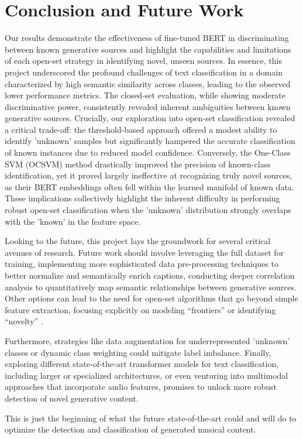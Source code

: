 \documentclass[conference]{IEEEtran}  %
\begin{document}
\section{Conclusion and Future Work}

Our results demonstrate the effectiveness of fine-tuned BERT in discriminating between known generative sources and highlight the capabilities and limitations of each open-set strategy in identifying novel, unseen sources. In essence, this project underscored the profound challenges of text classification in a domain characterized by high semantic similarity across classes, leading to the observed lower performance metrics. The closed-set evaluation, while showing moderate discriminative power, consistently revealed inherent ambiguities between known generative sources. Crucially, our exploration into open-set classification revealed a critical trade-off: the threshold-based approach offered a modest ability to identify 'unknown' samples but significantly hampered the accurate classification of known instances due to reduced model confidence. Conversely, the One-Class SVM (OCSVM) method drastically improved the precision of known-class identification, yet it proved largely ineffective at recognizing truly novel sources, as their BERT embeddings often fell within the learned manifold of known data. These implications collectively highlight the inherent difficulty in performing robust open-set classification when the 'unknown' distribution strongly overlaps with the 'known' in the feature space. 

Looking to the future, this project lays the groundwork for several critical avenues of research. Future work should involve leveraging the full dataset for training, implementing more sophisticated data pre-processing techniques to better normalize and semantically enrich captions, conducting deeper correlation analysis to quantitatively map semantic relationships between generative sources. 
Other options can lead to the need for open-set algorithms that go beyond simple feature extraction, focusing explicitly on modeling “frontiers” or identifying “novelty” \cite{hendrycks2018baselinedetectingmisclassifiedoutofdistribution}.

Furthermore, strategies like data augmentation \cite{article} for underrepresented 'unknown' classes or dynamic class weighting \cite{9324926} could mitigate label imbalance. Finally, exploring different state-of-the-art transformer models for text classification, including larger or specialized architectures, or even venturing into multimodal approaches that incorporate audio features, promises to unlock more robust detection of novel generative content. 

This is just the beginning of what the future state-of-the-art could and will do to optimize the detection and classification of generated musical content.

\nocite{*}
\end{document}
